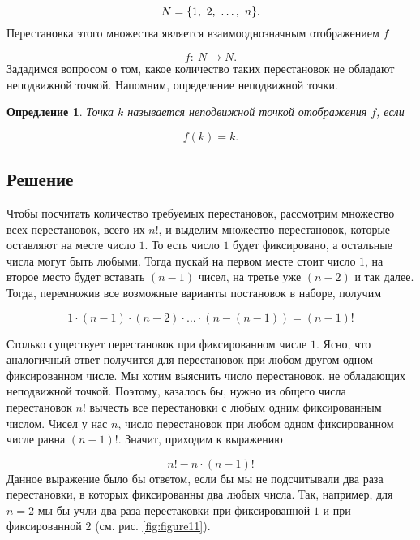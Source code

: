 \documentclass[12pt]{article}
\newtheorem{definition}{Опредление}[section]
\begin{document}
\begin{equation}
 	N = \qty{1,\ 2, \ \ldots,\ n}.
 \end{equation} 
Перестановка этого множества является взаимооднозначным отображением $f$

\begin{equation}
	f:\ N\longrightarrow N.
\end{equation}
Зададимся вопросом о том, какое количество таких перестановок не обладают неподвижной точкой. Напомним, определение неподвижной точки.

\begin{definition}
	Точка $k$ называется неподвижной точкой отображения $f$, если 

	\begin{equation}
		f(k) = k.
	\end{equation}
\end{definition}

\subsection{Решение} %
Чтобы посчитать количество требуемых перестановок, рассмотрим множество всех перестановок, всего их $n!$, и выделим множество перестановок, которые оставляют на месте число $1$. То есть число $1$ будет фиксировано, а остальные числа могут быть любыми. Тогда пускай на первом месте стоит число  $1$, на второе место будет вставать $(n-1)$ чисел, на третье уже $(n-2)$ и так далее. Тогда, перемножив все возможные варианты постановок в наборе, получим 

\begin{equation}
	1 \cdot (n-1) \cdot (n-2) \cdot \ldots \cdot (n-(n-1)) = (n-1)!
\end{equation}

Столько существует перестановок при фиксированном числе $1$. Ясно, что аналогичный ответ получится для перестановок при любом другом одном фиксированном числе. Мы хотим выяснить число перестановок, не обладающих неподвижной точкой. Поэтому, казалось бы, нужно из общего числа перестановок $n!$ вычесть все перестановки с любым одним фиксированным числом. Чисел у нас $n$, число перестановок при любом одном фиксированном числе равна $(n-1)!$. Значит, приходим к выражению

\begin{equation} \label{eq:s0}
	n! - n\cdot(n-1)!
\end{equation}
Данное выражение было бы ответом, если бы мы не подсчитывали два раза перестановки, в которых фиксированны два любых числа. Так, например, для $n=2$ мы бы учли два раза перестаковки при фиксированной $1$ и при фиксированной $2$ (см. рис. \ref{fig:figure11}). 
\end{document}
